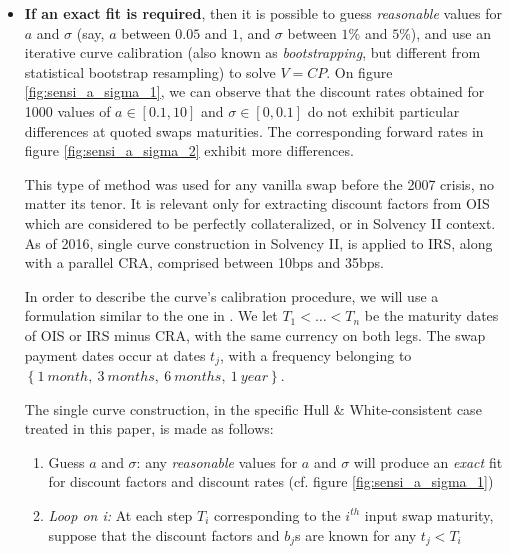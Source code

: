 \begin{itemize}
\item \textbf{If an exact fit is required}, then it is possible to guess \textit{reasonable} values for $a$ and $\sigma$ (say, $a$ between $0.05$ and $1$, and $\sigma$ between $1\%$ and $5\%$), and use an iterative curve calibration (also known as \textit{bootstrapping}, but different from statistical bootstrap resampling) to solve $V = CP$. On figure \ref{fig:sensi_a_sigma_1}, we can observe that the discount rates obtained for 1000 values of $a \in [0.1, 10]$ and $\sigma \in [0, 0.1]$ do not exhibit particular differences at quoted swaps maturities. The  corresponding forward rates in figure \ref{fig:sensi_a_sigma_2} exhibit more differences. 

\medskip

This type of method was used for any vanilla swap before the 2007 crisis, no matter its tenor. It is relevant only for extracting discount factors from OIS which are considered to be perfectly collateralized, or in Solvency II context. As of 2016, single curve construction in Solvency II, is applied to IRS, along with a parallel CRA, comprised between 10bps and 35bps.

\medskip

In order to describe the curve's calibration procedure, we will use a formulation similar to the one in \cite{andersen2010interest}. We let $T_1 < \ldots < T_n$ be the maturity dates of OIS or IRS minus CRA, with the same currency on both legs. The swap payment dates occur at dates $t_j$, with a frequency belonging to $\left\lbrace 1 \: month,\: 3 \: months,\: 6 \: months,\: 1 \: year \right\rbrace$.

\medskip

The single curve construction, in the specific Hull \& White-consistent case treated in this paper, is made as follows:

\medskip

\begin{enumerate}
\item Guess $a$ and $\sigma$: any {\it reasonable} values for $a$ and $\sigma$ will produce an \textit{exact} fit for discount factors and discount rates (cf. figure \ref{fig:sensi_a_sigma_1})

\medskip

\item {\it Loop on i: }At each step $T_i$ corresponding to the $i^{th}$ input swap maturity, suppose that the discount factors and $b_j$s are known for any $t_j < T_i$


\end{enumerate}
\end{itemize}
